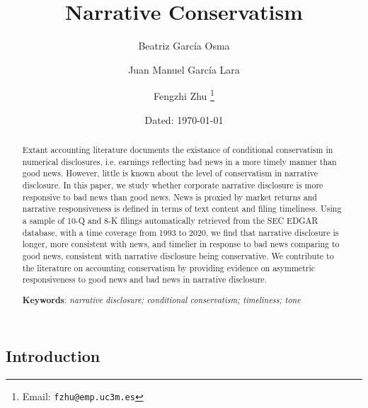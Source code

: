 \documentclass[a4paper]{article}
\begin{document}
	
	\title{Narrative Conservatism}
	
	\author{Beatriz Garc\'ia Osma}
	
	\author{Juan Manuel Garc\'ia Lara}
	
	\author{Fengzhi Zhu%
		\thanks{Email: \texttt{fzhu@emp.uc3m.es}}}
	
	
	\date{Dated: \today}
	
	\maketitle

\begin{spacing}{2}
\begin{abstract}
	Extant accounting literature documents the existance of conditional conservatism in numerical disclosures, i.e. earnings reflecting bad news in a more timely manner than good news. However, little is known about the level of conservatism in narrative disclosure. In this paper, we study whether corporate narrative disclosure is more responsive to bad news than good news. News is proxied by market returns and narrative responsiveness is defined in terms of text content and filing timeliness. Using a sample of 10-Q and 8-K filings automatically retrieved from the SEC EDGAR database, with a time coverage from 1993 to 2020, we find that narrative disclosure is longer, more consistent with news, and timelier in response to bad news comparing to good news, consistent with narrative disclosure being conservative. 
	We contribute to the literature on accounting conservatism by providing evidence on asymmetric responsiveness to good news and bad news in narrative disclosure.\\
	\newline
	
	\textbf{Keywords}: \textit{narrative disclosure;  conditional conservatism; timeliness; tone}
\end{abstract}

\clearpage

\section{Introduction}
\cite{}




\end{spacing}
\end{document}
